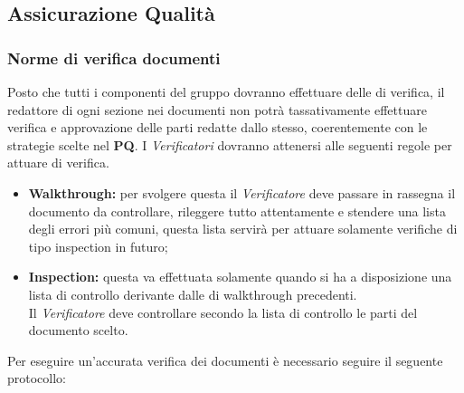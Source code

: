 \documentclass{scalatekids-article}
\begin{document}
\subsection{Assicurazione Qualità}

\subsubsection{Norme di verifica documenti}

Posto che tutti i componenti del gruppo dovranno effettuare delle  di
verifica, il redattore di ogni sezione nei documenti non potrà tassativamente
effettuare verifica e approvazione delle parti redatte dallo stesso,
coerentemente con le strategie scelte nel \textbf{PQ}.
I \textit{Verificatori} dovranno attenersi alle seguenti regole per attuare  di verifica.
\begin{itemize}
    \item \textbf{Walkthrough:} per svolgere questa  il \textit{Verificatore} deve passare in rassegna il documento da controllare, rileggere tutto attentamente e stendere una lista degli errori più comuni, questa lista servirà per attuare solamente verifiche di tipo inspection in futuro;
    \item \textbf{Inspection:} questa  va effettuata solamente quando si ha a disposizione una lista di controllo derivante dalle  di walkthrough precedenti.\\
        Il \textit{Verificatore} deve controllare secondo la lista di controllo le parti del documento scelto.
\end{itemize}
Per eseguire un'accurata verifica dei documenti è necessario seguire il seguente
protocollo:
\end{document}
